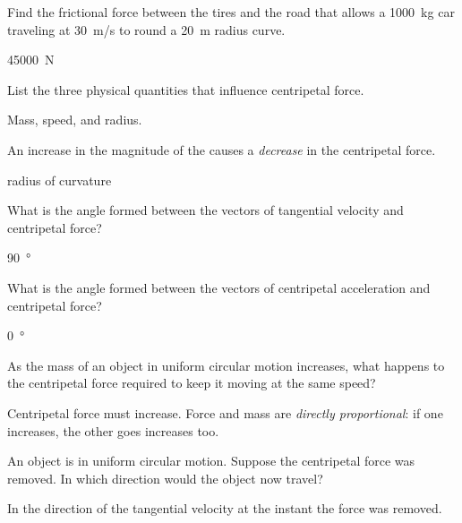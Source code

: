 \documentclass[../main-physics-problems.tex]{subfiles}
\begin{document}
\begin{questions}
\question \label{MJm5VE} %
Find the frictional force between the tires and the road that allows a \SI{1000}{kg} car traveling at \SI{30}{m/s} to round a \SI{20}{m} radius curve.

\begin{solution}
\SI{45000}{N}
\end{solution}

\question \label{GD8Yff} %
List the three physical quantities that influence centripetal force.

\begin{solution}
Mass, speed, and radius.
\end{solution}

\question \label{aEtlVz} %
An increase in the magnitude of the  causes a \textit{decrease} in the centripetal force.

\begin{solution}
radius of curvature
\end{solution}

\question \label{wS6Htw} %
What is the angle formed between the vectors of tangential velocity and centripetal force?

\begin{solution}
\SI{90}{\degree}
\end{solution}


\question \label{barV9C} %
What is the angle formed between the vectors of centripetal acceleration and centripetal force?

\begin{solution}
\SI{0}{\degree}
\end{solution}


\question \label{M6NkHB} %
As the mass of an object in uniform circular motion increases, what happens to the centripetal force required to keep it moving at the same speed?

\begin{solution}
Centripetal force must increase. Force and mass are \textit{directly proportional}: if one increases, the other goes increases too.
\end{solution}

\question \label{G8I4Up} %
An object is in uniform circular motion. Suppose the centripetal force was removed. In which direction would the object now travel?

\begin{solution}
In the direction of the tangential velocity at the instant the force was removed.
\end{solution}



\end{questions}
\end{document}
